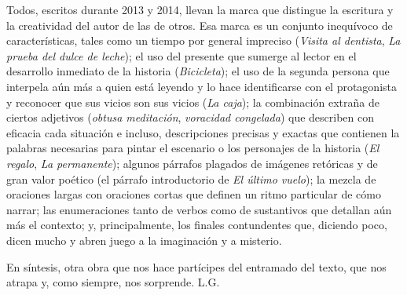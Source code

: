 \documentclass[12pt,twoside,openright,a5paper]{book}
\begin{document}
Todos, escritos durante 2013 y 2014, llevan la marca 
que distingue la escritura y la creatividad del autor de las de otros. Esa marca es un 
conjunto inequívoco de características, tales como un tiempo por general impreciso (\emph{Visita 
al dentista}, \emph{La prueba del dulce de leche}); el uso del presente que sumerge al lector en el 
desarrollo inmediato de la historia (\emph{Bicicleta}); el uso de la segunda persona que interpela 
aún más a quien está leyendo y lo hace identificarse con el protagonista y reconocer que sus 
vicios son sus vicios (\emph{La caja}); la combinación extraña de ciertos adjetivos (\emph{obtusa 
meditación}, \emph{voracidad congelada}) que describen con eficacia cada situación e incluso, 
descripciones precisas y exactas que contienen la palabras necesarias para pintar el 
escenario o los personajes de la historia (\emph{El regalo}, \emph{La permanente}); algunos párrafos 
plagados de imágenes retóricas y de gran valor poético (el párrafo introductorio de \emph{El 
último vuelo}); la mezcla de oraciones largas con oraciones cortas que definen un ritmo 
particular de cómo narrar; las enumeraciones tanto de verbos como de sustantivos que 
detallan aún más el contexto; y, principalmente, los finales contundentes que, diciendo 
poco, dicen mucho y abren juego a la imaginación y a misterio.

En síntesis, otra obra que nos hace partícipes del entramado del texto, que nos atrapa y, 
como siempre, nos sorprende. L.G.


%



%















%






\end{document}
